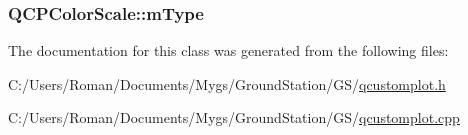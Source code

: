 \subsubsection[{m\+Type}]{ Q\+C\+P\+Color\+Scale\+::m\+Type\hspace{0.3cm}{\ttfamily [protected]}}\label{class_q_c_p_color_scale_a7d47ed4ab76f38e50164e9d77fe33789}


The documentation for this class was generated from the following files\+:\begin{DoxyCompactItemize}
\item 
C\+:/\+Users/\+Roman/\+Documents/\+Mygs/\+Ground\+Station/\+G\+S/\hyperlink{qcustomplot_8h}{qcustomplot.\+h}\item 
C\+:/\+Users/\+Roman/\+Documents/\+Mygs/\+Ground\+Station/\+G\+S/\hyperlink{qcustomplot_8cpp}{qcustomplot.\+cpp}\end{DoxyCompactItemize}
